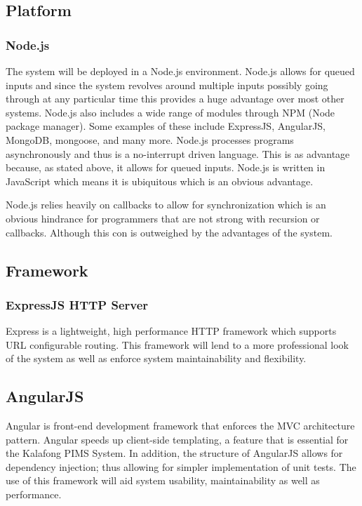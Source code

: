 \subsection{Platform}
\subsubsection{Node.js}
The system will be deployed in a Node.js environment. Node.js allows for queued inputs and since the system revolves around multiple inputs possibly going through at any particular time this provides a huge advantage over most other systems. Node.js also includes a wide range of modules through NPM (Node package manager). Some examples of these include ExpressJS, AngularJS, MongoDB, mongoose, and many more. Node.js processes programs asynchronously and thus is a no-interrupt driven language. This is as advantage because, as stated above, it allows for queued inputs. Node.js is written in JavaScript which means it is ubiquitous which is an obvious advantage.

Node.js relies heavily on callbacks to allow for synchronization which is an obvious hindrance for programmers that are not strong with recursion or callbacks. Although this con is outweighed by the advantages of the system.

\subsection{Framework}
\subsubsection{ExpressJS HTTP Server}
Express is a lightweight, high performance HTTP framework which supports URL configurable routing. This framework will lend to a more professional look of the system as well as enforce system maintainability and flexibility.

\subsection{AngularJS}
Angular is front-end development framework that enforces the MVC architecture pattern. Angular speeds up client-side templating, a feature that is essential for the Kalafong PIMS System. In addition, the structure of AngularJS allows for dependency injection; thus allowing for simpler implementation of unit tests. The use of this framework will aid system usability, maintainability as well as performance.

